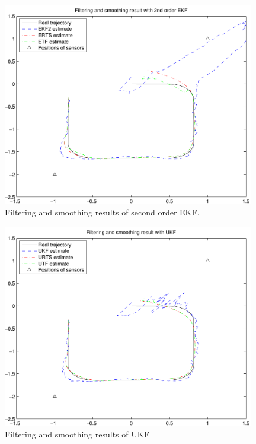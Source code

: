 %
\begin{figure}
\begin{center}
\includegraphics[width=11cm]{pics/bot_demo_ekf2}
\caption{Filtering and smoothing results of second order EKF.}
\label{fig:bot_ekf2}
\end{center}
\end{figure}

\begin{figure}
\begin{center}
\includegraphics[width=11cm]{pics/bot_demo_ukf}
\caption{Filtering and smoothing results of UKF}
\label{fig:bot_ukf}
\end{center}
\end{figure}













